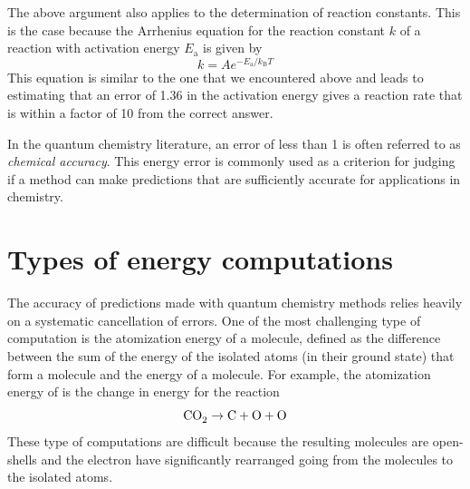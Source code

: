 \documentclass[../Main/chem371-notes.tex]{subfiles}
\begin{document}
The above argument also applies to the determination of reaction constants.
This is the case because the Arrhenius equation for the reaction constant $k$ of a reaction with activation energy $E_\mathrm{a}$ is given by 
\begin{equation}
k=A e^{-E_\mathrm {a} / k_\mathrm{B}  T}
\end{equation}
This equation is similar to the one that we encountered above and leads to estimating that an error of 1.36 \kcal in the activation energy gives a reaction rate that is within a factor of 10 from the correct answer.

In the quantum chemistry literature, an error of less than 1 \kcal is often referred to as \emph{chemical accuracy}.
This energy error is commonly used as a criterion for judging if a method can make predictions that are sufficiently accurate for applications in chemistry.

\section{Types of energy computations}
The accuracy of predictions made with quantum chemistry methods relies heavily on a systematic cancellation of errors.
One of the most challenging type of computation is the atomization energy of a molecule, defined as the difference between the sum of the energy of the isolated atoms (in their ground state) that form a molecule and the energy of a molecule.
For example, the atomization energy of  is the change in energy for the reaction
\begin{equation}
\ce{CO2} \rightarrow \ce{C} + \ce{O} + \ce{O}
\end{equation}
These type of computations are difficult because the resulting molecules are open-shells and the electron have significantly rearranged going from the molecules to the isolated atoms.
\end{document}
